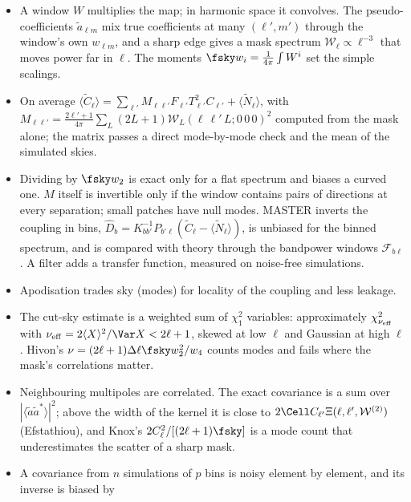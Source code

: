 \begin{recap}
\begin{itemize}[itemsep=1pt,leftmargin=1.2em]
  \item A window $W$ multiplies the map; in harmonic space it convolves. The pseudo-coefficients
        $\tilde a_{\ell m}$ mix true coefficients at many $(\ell',m')$ through the window's own $w_{\ell m}$, and a
        sharp edge gives a mask spectrum $\mathcal W_\ell\propto\ell^{-3}$ that moves power far in $\ell$.
        The moments $\fsky w_i=\frac1{4\pi}\int W^i$ set the simple scalings.
  \item On average $\langle\widetilde C_\ell\rangle=\sum_{\ell'}M_{\ell\ell'}F_{\ell'}T^2_{\ell'}C_{\ell'}+\langle\widetilde N_\ell\rangle$, with
        $M_{\ell\ell'}=\frac{2\ell'+1}{4\pi}\sum_L(2L+1)\mathcal W_L(\ell\,\ell'\,L;0\,0\,0)^2$ computed from the
        mask alone; the matrix passes a direct mode-by-mode check and the mean of the simulated skies.
  \item Dividing by $\fsky w_2$ is exact only for a flat spectrum and biases a curved one. $M$ itself is
        invertible only if the window contains pairs of directions at every separation; small
        patches have null modes. MASTER inverts the coupling in bins, $\widehat D_b=K^{-1}_{bb'}P_{b'\ell}(\widetilde C_\ell-\langle\widetilde N_\ell\rangle)$,
        is unbiased for the binned spectrum, and is compared with theory through the bandpower windows
        $\mathcal F_{b\ell}$. A filter adds a transfer function, measured on noise-free simulations.
  \item Apodisation trades sky (modes) for locality of the coupling and less leakage.
  \item The cut-sky estimate is a weighted sum of $\chi^2_1$ variables: approximately
        $\chi^2_{\nu_{\rm eff}}$ with $\nu_{\rm eff}=2\langle X\rangle^2/\Var X<2\ell+1$, skewed at low $\ell$ and Gaussian at high $\ell$.
        Hivon's $\nu=(2\ell+1)\Delta\ell\fsky w_2^2/w_4$ counts modes and fails where the mask's correlations matter.
  \item Neighbouring multipoles are correlated. The exact covariance is a sum over $|\langle\tilde a\tilde a^*\rangle|^2$;
        above the width of the kernel it is close to $2\Cell C_{\ell'}\Xi(\ell,\ell',\mathcal W^{(2)})$ (Efstathiou), and
        Knox's $2C^2_\ell/[(2\ell+1)\fsky]$ is a mode count that underestimates the scatter of a sharp mask.
  \item A covariance from $n$ simulations of $p$ bins is noisy element by element, and its inverse is biased by

\end{itemize}
\end{recap}
